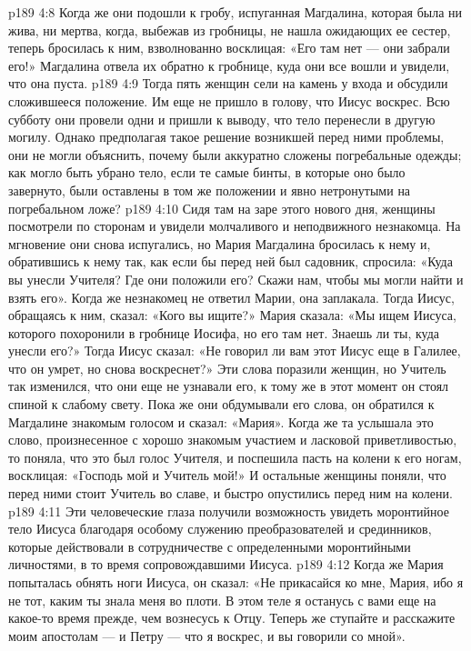 \vs p189 4:8 Когда же они подошли к гробу, испуганная Магдалина, которая была ни жива, ни мертва, когда, выбежав из гробницы, не нашла ожидающих ее сестер, теперь бросилась к ним, взволнованно восклицая: «Его там нет --- они забрали его!» Магдалина отвела их обратно к гробнице, куда они все вошли и увидели, что она пуста.
\vs p189 4:9 Тогда пять женщин сели на камень у входа и обсудили сложившееся положение. Им еще не пришло в голову, что Иисус воскрес. Всю субботу они провели одни и пришли к выводу, что тело перенесли в другую могилу. Однако предполагая такое решение возникшей перед ними проблемы, они не могли объяснить, почему были аккуратно сложены погребальные одежды; как могло быть убрано тело, если те самые бинты, в которые оно было завернуто, были оставлены в том же положении и явно нетронутыми на погребальном ложе?
\vs p189 4:10 \pc Сидя там на заре этого нового дня, женщины посмотрели по сторонам и увидели молчаливого и неподвижного незнакомца. На мгновение они снова испугались, но Мария Магдалина бросилась к нему и, обратившись к нему так, как если бы перед ней был садовник, спросила: «Куда вы унесли Учителя? Где они положили его? Скажи нам, чтобы мы могли найти и взять его». Когда же незнакомец не ответил Марии, она заплакала. Тогда Иисус, обращаясь к ним, сказал: «Кого вы ищите?» Мария сказала: «Мы ищем Иисуса, которого похоронили в гробнице Иосифа, но его там нет. Знаешь ли ты, куда унесли его?» Тогда Иисус сказал: «Не говорил ли вам этот Иисус еще в Галилее, что он умрет, но снова воскреснет?» Эти слова поразили женщин, но Учитель так изменился, что они еще не узнавали его, к тому же в этот момент он стоял спиной к слабому свету. Пока же они обдумывали его слова, он обратился к Магдалине знакомым голосом и сказал: «Мария». Когда же та услышала это слово, произнесенное с хорошо знакомым участием и ласковой приветливостью, то поняла, что это был голос Учителя, и поспешила пасть на колени к его ногам, восклицая: «Господь мой и Учитель мой!» И остальные женщины поняли, что перед ними стоит Учитель во славе, и быстро опустились перед ним на колени.
\vs p189 4:11 Эти человеческие глаза получили возможность увидеть моронтийное тело Иисуса благодаря особому служению преобразователей и срединников, которые действовали в сотрудничестве с определенными моронтийными личностями, в то время сопровождавшими Иисуса.
\vs p189 4:12 \pc Когда же Мария попыталась обнять ноги Иисуса, он сказал: «Не прикасайся ко мне, Мария, ибо я не тот, каким ты знала меня во плоти. В этом теле я останусь с вами еще на какое\hyp{}то время прежде, чем вознесусь к Отцу. Теперь же ступайте и расскажите моим апостолам --- и Петру --- что я воскрес, и вы говорили со мной».
